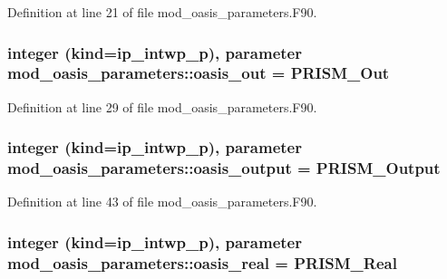 Definition at line 21 of file mod\+\_\+oasis\+\_\+parameters.\+F90.

\hypertarget{classmod__oasis__parameters_a76a150fa8ef6ed0b35183e627d757439}{
\subsubsection[{oasis\+\_\+out}]{\setlength{\rightskip}{0pt plus 5cm}integer (kind=ip\+\_\+intwp\+\_\+p), parameter mod\+\_\+oasis\+\_\+parameters\+::oasis\+\_\+out = P\+R\+I\+S\+M\+\_\+\+Out}}\label{classmod__oasis__parameters_a76a150fa8ef6ed0b35183e627d757439}


Definition at line 29 of file mod\+\_\+oasis\+\_\+parameters.\+F90.

\hypertarget{classmod__oasis__parameters_a7f9f81f3b1f2c8b09a460aeca27ea859}{
\subsubsection[{oasis\+\_\+output}]{\setlength{\rightskip}{0pt plus 5cm}integer (kind=ip\+\_\+intwp\+\_\+p), parameter mod\+\_\+oasis\+\_\+parameters\+::oasis\+\_\+output = P\+R\+I\+S\+M\+\_\+\+Output}}\label{classmod__oasis__parameters_a7f9f81f3b1f2c8b09a460aeca27ea859}


Definition at line 43 of file mod\+\_\+oasis\+\_\+parameters.\+F90.

\hypertarget{classmod__oasis__parameters_ae7760fcfae19d2f3cbf759688cd35193}{
\subsubsection[{oasis\+\_\+real}]{\setlength{\rightskip}{0pt plus 5cm}integer (kind=ip\+\_\+intwp\+\_\+p), parameter mod\+\_\+oasis\+\_\+parameters\+::oasis\+\_\+real = P\+R\+I\+S\+M\+\_\+\+Real}}\label{classmod__oasis__parameters_ae7760fcfae19d2f3cbf759688cd35193}



